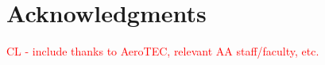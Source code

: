 \section*{Acknowledgments}\label{sec:acknowledgements}

\textcolor{red}{CL - include thanks to AeroTEC, relevant AA staff/faculty, etc.}